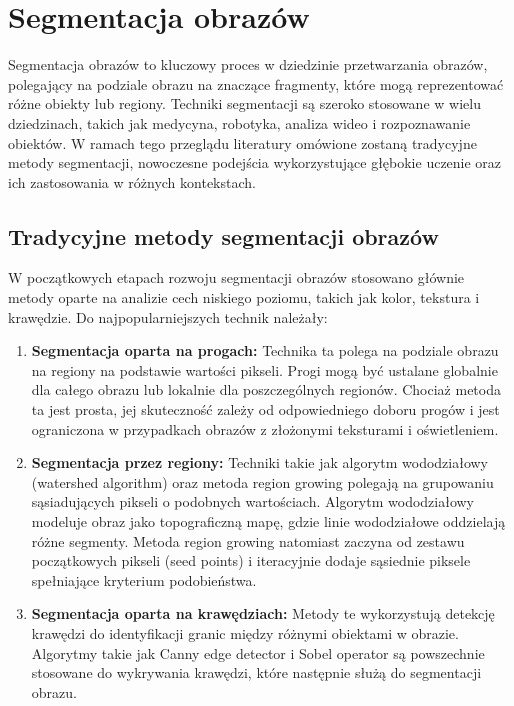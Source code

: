 \section*{Segmentacja obrazów}

Segmentacja obrazów to kluczowy proces w dziedzinie przetwarzania obrazów,
polegający na podziale obrazu na znaczące fragmenty, które mogą reprezentować 
różne obiekty lub regiony. Techniki segmentacji są szeroko stosowane w wielu dziedzinach,
takich jak medycyna, robotyka, analiza wideo i rozpoznawanie obiektów. W ramach tego przeglądu 
literatury omówione zostaną tradycyjne metody segmentacji, nowoczesne podejścia wykorzystujące 
głębokie uczenie oraz ich zastosowania w różnych kontekstach.

\subsection*{Tradycyjne metody segmentacji obrazów}

W początkowych etapach rozwoju segmentacji obrazów stosowano głównie metody oparte na analizie 
cech niskiego poziomu, takich jak kolor, tekstura i krawędzie. Do najpopularniejszych technik należały:

\begin{enumerate}
    \item \textbf{Segmentacja oparta na progach:} Technika ta polega na podziale obrazu na regiony 
    na podstawie wartości pikseli. Progi mogą być ustalane globalnie dla całego obrazu lub lokalnie 
    dla poszczególnych regionów. Chociaż metoda ta jest prosta, jej skuteczność zależy od 
    odpowiedniego doboru progów i jest ograniczona w przypadkach obrazów z złożonymi teksturami i 
    oświetleniem.
    \item \textbf{Segmentacja przez regiony:} Techniki takie jak algorytm wododziałowy (watershed 
    algorithm) oraz metoda region growing polegają na grupowaniu sąsiadujących pikseli o podobnych 
    wartościach. Algorytm wododziałowy modeluje obraz jako topograficzną mapę, gdzie linie 
    wododziałowe oddzielają różne segmenty. Metoda region growing natomiast zaczyna od zestawu 
    początkowych pikseli (seed points) i iteracyjnie dodaje sąsiednie piksele spełniające kryterium 
    podobieństwa.
    \item \textbf{Segmentacja oparta na krawędziach:} Metody te wykorzystują detekcję krawędzi 
    do identyfikacji granic między różnymi obiektami w obrazie. Algorytmy takie jak Canny edge 
    detector i Sobel operator są powszechnie stosowane do wykrywania krawędzi, które następnie 
    służą do segmentacji obrazu.
\end{enumerate}

